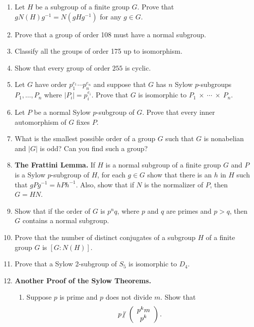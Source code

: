 {\begin{enumerate}
\item
Let $H$ be a subgroup of a finite group $G$. Prove that $g N(H) g^{-1}
= N(gHg^{-1})$ for any $g \in G$. 

\item
Prove that a group of order 108 must have a normal subgroup.

\item
Classify all the groups of order 175 up to isomorphism.

\item
Show that every group of order $255$ is cyclic.

\item
Let $G$ have order $p_1^{e_1} \cdots p_n^{e_n}$ and suppose that $G$
has $n$ Sylow \mbox{$p$-subgroups} $P_1, \ldots, P_n$ where 
$|P_i| = p_i^{e_i}$.  Prove that $G$ is isomorphic to 
$P_1~\times~\cdots~\times~P_n$. 
 
\item
Let $P$ be a normal Sylow $p$-subgroup of $G$.  Prove that every inner
automorphism of $G$ fixes $P$.  
 
 
\item
What is the smallest possible order of a group $G$ such that $G$ is
nonabelian and $|G|$ is odd?  Can you find such a group?
 
 
\item
{\bf The Frattini Lemma.}  
If $H$ is a normal subgroup of a finite group $G$ and $P$ is a Sylow
$p$-subgroup of $H$, for each $g \in G$ show that there is an $h$ in
$H$ such that $gPg^{-1} = hPh^{-1}$.  Also, show that if $N$ is the
normalizer of $P$, then $G= HN$. 
 
 
\item
Show that if the order of $G$ is $p^nq$, where $p$ and $q$ are primes
and $p>q$, then $G$ contains a normal subgroup. 
 
 
\item
Prove that the number of distinct conjugates of a subgroup $H$ of a 
finite group $G$ is $[G : N(H) ]$. 
 
 
\item
Prove that a Sylow 2-subgroup of $S_5$ is isomorphic to $D_4$.
 
 
\item
{\bf Another Proof of the Sylow Theorems.}
\begin{enumerate}
 
\item
Suppose $p$ is prime and $p$ does not divide $m$.  Show that
$$
p {\not\:\mid\ }
\left(
\begin{array}{c}
p^k m \\ p^k
\end{array}
\right).
$$
 

\end{enumerate}
\end{enumerate}}

